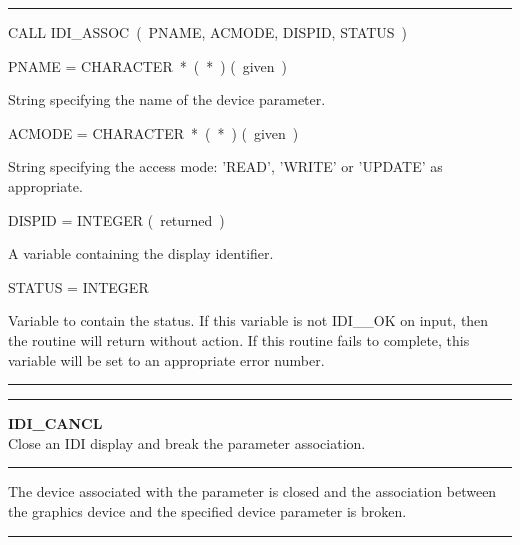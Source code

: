 {\rule{160mm}{0.1mm}

\hspace*{10mm}\parbox{140mm}{
CALL IDI\_ASSOC~(~PNAME, ACMODE, DISPID, STATUS~)}

\hspace*{10mm}\parbox{140mm}{
PNAME = CHARACTER~*~(~*~) \hspace{10mm} (~given~)}

\hspace*{30mm}\parbox{120mm}{
String specifying the name of the device parameter.}

\hspace*{10mm}\parbox{140mm}{
ACMODE = CHARACTER~*~(~*~) \hspace{10mm} (~given~)}

\hspace*{30mm}\parbox{120mm}{
String specifying the access mode: 'READ', 'WRITE' or 'UPDATE' as
appropriate.}

\hspace*{10mm}\parbox{140mm}{
DISPID = INTEGER \hspace{10mm} (~returned~)}

\hspace*{30mm}\parbox{120mm}{
A variable containing the display identifier.}

\hspace*{10mm}\parbox{140mm}{
STATUS = INTEGER}

\hspace*{30mm}\parbox{120mm}{
Variable to contain the status. If this variable is not IDI\_\_OK on input,
then the routine will return without action. If this routine fails to
complete, this variable will be set to an appropriate error number.}

\rule{160mm}{0.5mm}


\rule{160mm}{0.5mm}

\hspace*{10mm}\parbox{140mm}{
{\bf IDI\_CANCL\label{IDI_CANCL}} \\
Close an IDI display and break the parameter association.}

\rule{160mm}{0.1mm}

\hspace*{10mm}\parbox{140mm}{
The device associated with the parameter is closed and the association
between the graphics device and the specified device parameter is broken.}

\rule{160mm}{0.1mm}

}
